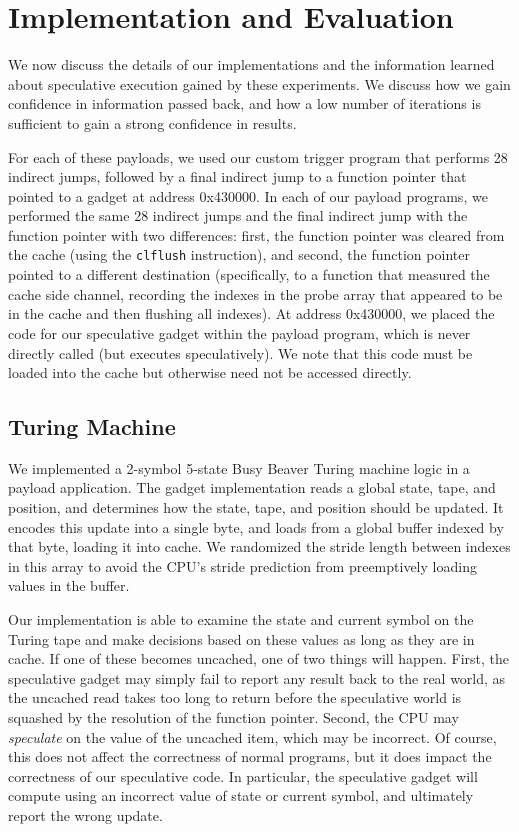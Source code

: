 
\section{Implementation and Evaluation}
We now discuss the details of our implementations and the information learned
about speculative execution gained by these experiments. We discuss how we gain
confidence in information passed back, and how a low number of iterations is
sufficient to gain a strong confidence in results.

For each of these payloads, we used our custom trigger program that performs 28
indirect jumps, followed by a final indirect jump to a function pointer that
pointed to a gadget at address 0x430000. In each of our payload programs,
we performed the same 28 indirect jumps and the final indirect jump with the
function pointer with two differences: first, the function pointer was cleared
from the cache (using the \texttt{clflush} instruction), and second, the
function pointer pointed to a different destination (specifically, to a
function
that measured the cache side channel, recording the indexes in the probe array
that appeared to be in the cache and then flushing all indexes).
At address 0x430000, we placed the code for our speculative gadget within the 
payload program, which is never directly called
(but executes speculatively). We note that this code must be loaded into the
cache but otherwise need not be accessed directly.


\subsection{Turing Machine}
\label{subsec:impl-turing}

\FigTuringSuccess

We implemented a 2-symbol 5-state Busy Beaver Turing machine logic in a  
payload application. The gadget implementation reads a global state,
tape, and position, and determines how the state, tape, and position should be
updated. It encodes this update into a single byte, and loads from a global
buffer indexed by that byte, loading it into cache.
We randomized the stride length between indexes in
this array to avoid the CPU's stride prediction from preemptively loading values
in the buffer.


Our implementation is able to examine the state and current symbol
on the Turing tape and make decisions based on these values as long as they are
in cache. If one of these becomes uncached, one of two things will happen.
First, the speculative gadget may simply fail to report any result back to the
real world, as the uncached read takes too long to return before the speculative
world is squashed by the resolution of the function pointer. Second, the CPU may
\emph{speculate} on the value of the uncached item, which may be incorrect. Of
course, this does not affect the correctness of normal programs, but it does
impact the correctness of our speculative code. In particular, the speculative
gadget will compute using an incorrect value of state or current
symbol, and ultimately report the wrong update.


